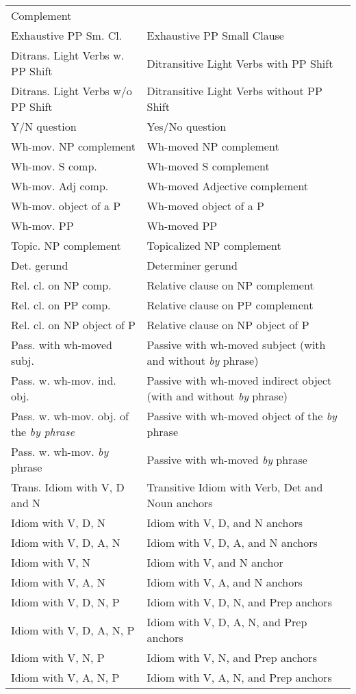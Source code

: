 \begin{tabular}{ll}
Complement\\
Exhaustive PP Sm. Cl.&Exhaustive PP Small Clause\\
Ditrans. Light Verbs w. PP Shift&Ditransitive Light Verbs with PP Shift\\
Ditrans. Light Verbs w/o PP Shift&Ditransitive Light Verbs without PP Shift\\
Y/N question&Yes/No question \\
Wh-mov. NP complement&Wh-moved NP complement \\
Wh-mov. S comp.&Wh-moved S complement \\
Wh-mov. Adj comp.&Wh-moved Adjective complement \\
Wh-mov. object of a P&Wh-moved object of a P \\
Wh-mov. PP&Wh-moved PP \\
Topic. NP complement&Topicalized NP complement \\
Det. gerund&Determiner gerund \\
Rel. cl. on NP comp.&Relative clause on NP complement \\
Rel. cl. on PP comp.& Relative clause on PP complement\\
Rel. cl. on NP object of P& Relative clause on NP object of P\\
Pass. with wh-moved subj.&Passive with wh-moved subject (with and without {\it by} phrase) \\
Pass. w. wh-mov. ind. obj.&Passive with wh-moved indirect object (with and without {\it by} phrase) \\
Pass. w. wh-mov. obj. of the {\it {\it by} phrase}&Passive with wh-moved object of the {\it by} phrase \\
Pass. w. wh-mov. {\it by} phrase&Passive with wh-moved {\it by} phrase \\
Trans. Idiom with V, D and N & Transitive Idiom with Verb, Det and
Noun anchors\\
Idiom with V, D, N & Idiom with V, D, and N anchors \\
Idiom with V, D, A, N & Idiom with V, D, A, and N anchors \\
Idiom with V, N & Idiom with V, and N anchor \\
Idiom with V, A, N & Idiom with V, A, and N anchors \\
Idiom with V, D, N, P & Idiom with V, D, N, and Prep anchors \\
Idiom with V, D, A, N, P & Idiom with V, D, A, N, and Prep anchors \\
Idiom with V, N, P & Idiom with V, N, and Prep anchors \\
Idiom with V, A, N, P & Idiom with V, A, N, and Prep anchors 
\end{tabular}
\normalsize

